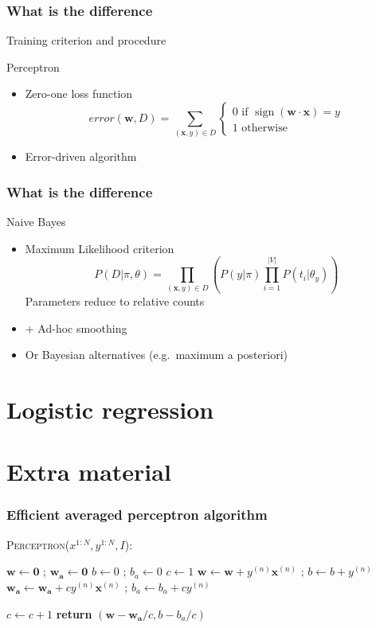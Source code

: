 \documentclass[14pt,mathserif]{beamer}
\DeclareMathOperator*{\sign}{sign}
\newcommand{\vecb}[1]{\mathbf{#1}}
\newcommand{\x}{\mathbf{x}}
\newcommand{\w}{\mathbf{w}}
\begin{document}
\begin{frame}
  \frametitle{What is the difference}
  Training criterion and procedure
  \begin{block}{Perceptron}
    \begin{itemize}
    \item Zero-one loss function    
      \[
      \mathit{error}(\w,D) = \sum_{(\x,y) \in D}
      \begin{cases}
        0 \text{ if } \sign(\w \cdot \x) = y\\
        1 \text{ otherwise }
      \end{cases}
      \]
    \item Error-driven algorithm
    \end{itemize}
  \end{block}
\end{frame}

\begin{frame}
  \frametitle{What is the difference}
  \begin{block}{ Naive Bayes}
    \begin{itemize}
  \item Maximum Likelihood criterion 
    \[
    P(D|\pi,\theta) = \prod_{(\x,y) \in D} \left(
      P(y|\pi)\prod_{i=1}^{|V|}P(t_i|\theta_y)\right)
    \]
    Parameters reduce to relative counts
  \item + Ad-hoc smoothing
  \item Or Bayesian alternatives (e.g.\ maximum a posteriori)
  \end{itemize}
\end{block}
\end{frame}


\section{Logistic regression}

\section{Extra material}
\begin{frame}
\frametitle{Efficient averaged perceptron algorithm}
 \begin{block}{\textsc{Perceptron}($x^{1:N},y^{1:N},I$):}
\begin{algorithmic}[1]
\STATE $\vecb{w} \leftarrow \vecb{0}$ ; $\vecb{w_a} \leftarrow \vecb{0}$
\STATE $b \leftarrow 0$ ; $b_a \leftarrow 0$
\STATE $c \leftarrow 1$
    		\IF {$y^{(n)} (\vecb{w}\cdot \x^{(n)}+b) \leq 0$}
        		\STATE $\vecb{w} \leftarrow \vecb{w} + y^{(n)} \x^{(n)}$ ; $b \leftarrow b + y^{(n)}$
			\STATE $\vecb{w_a} \leftarrow \vecb{w_a} + c y^{(n)} \x^{(n)}$ ; $b_a \leftarrow b_a + c y^{(n)}$

    		\ENDIF
        \STATE $c \leftarrow c + 1$
    	\ENDFOR
\ENDFOR
\STATE \textbf{return} $(\vecb{w}-\vecb{w_a}/c, b - b_a/c)$
\end{algorithmic}                 \end{block}
\end{frame}
\end{document}
